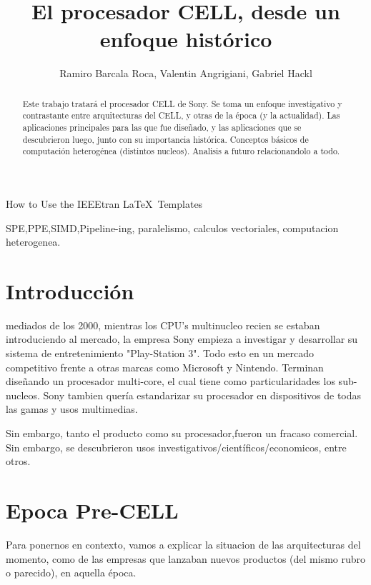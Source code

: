 \documentclass[10pt,compsoc]{IEEEtran}
\begin{document}
	\title{El procesador CELL, desde un enfoque
		histórico}
	\author{Ramiro Barcala Roca, Valentin Angrigiani, Gabriel Hackl}
		
	{How to Use the IEEEtran \LaTeX \ Templates}
	\maketitle
	
	\begin{abstract}
		Este trabajo tratará el procesador CELL de Sony. Se toma un enfoque investigativo y contrastante entre arquitecturas del CELL, y otras de la época (y la actualidad). Las aplicaciones principales para las que fue diseñado, y las aplicaciones que se descubrieron luego, junto  con su importancia histórica. Conceptos básicos de computación heterogénea (distintos nucleos). Analisis a futuro relacionandolo a todo.
	\end{abstract}
	
	\begin{IEEEkeywords}
		SPE,PPE,SIMD,Pipeline-ing, paralelismo, calculos vectoriales, computacion heterogenea.
	\end{IEEEkeywords}
	
	\section{Introducción}
	 mediados de los 2000, mientras los CPU's multinucleo recien se estaban introduciendo al mercado, la empresa Sony empieza a investigar y desarrollar su sistema de entretenimiento "Play-Station 3". Todo esto en un mercado competitivo frente a otras marcas como Microsoft y Nintendo. Terminan diseñando un procesador multi-core, el cual tiene como particularidades los sub-nucleos. Sony tambien quería estandarizar su procesador en dispositivos de todas las gamas y usos multimedias.
	
	Sin embargo, tanto el producto como su procesador,fueron un fracaso comercial. Sin embargo, se descubrieron usos investigativos/científicos/economicos, entre otros.
	
	
	\section{Epoca Pre-CELL}
	\noindent Para ponernos en contexto, vamos a explicar la situacion de las arquitecturas del momento, como de las empresas que lanzaban nuevos productos (del mismo rubro o parecido), en aquella época.
	
\end{document}
